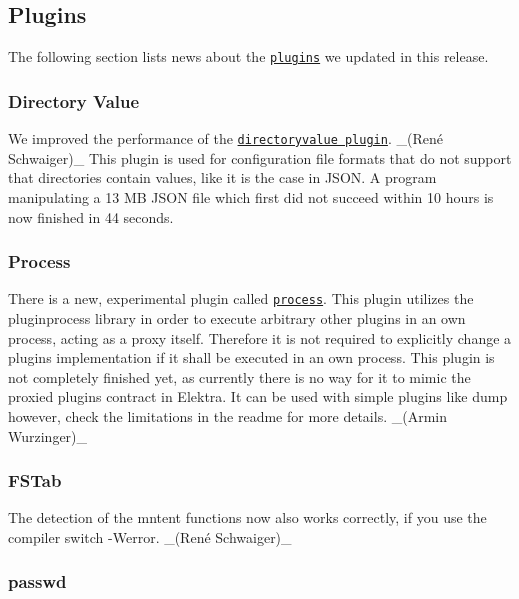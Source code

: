 \subsection*{Plugins}

The following section lists news about the \href{https://www.libelektra.org/plugins/readme}{\tt plugins} we updated in this release.

\subsubsection*{Directory Value}

We improved the performance of the \href{https://libelektra.org/plugins/directoryvalue}{\tt directoryvalue plugin}. \+\_\+(René Schwaiger)\+\_\+ This plugin is used for configuration file formats that do not support that directories contain values, like it is the case in J\+S\+ON. A program manipulating a 13 MB J\+S\+ON file which first did not succeed within 10 hours is now finished in 44 seconds.

\subsubsection*{Process}

There is a new, experimental plugin called \href{https://libelektra.org/plugins/process}{\tt process}. This plugin utilizes the pluginprocess library in order to execute arbitrary other plugins in an own process, acting as a proxy itself. Therefore it is not required to explicitly change a plugin\textquotesingle{}s implementation if it shall be executed in an own process. This plugin is not completely finished yet, as currently there is no way for it to mimic the proxied plugin\textquotesingle{}s contract in Elektra. It can be used with simple plugins like {\ttfamily dump} however, check the limitations in the readme for more details. \+\_\+(\+Armin Wurzinger)\+\_\+

\subsubsection*{F\+S\+Tab}

The detection of the {\ttfamily mntent} functions now also works correctly, if you use the compiler switch {\ttfamily -\/\+Werror}. \+\_\+(René Schwaiger)\+\_\+

\subsubsection*{passwd}

